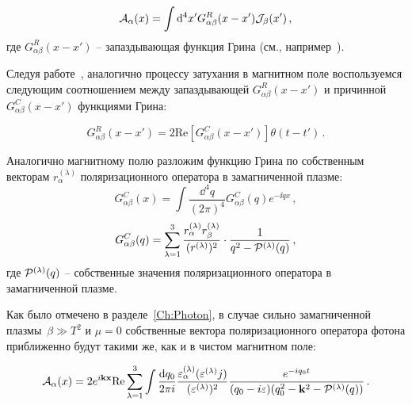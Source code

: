 \begin{equation}\label{eq:RetSol}
	{\cal A}_\alpha(x)=\int \mathrm{d}^4 x' G^R_{\alpha \beta}(x-x'){\cal J}_\beta(x')\, ,
\end{equation}
где $G^R_{\alpha \beta}(x-x')$ -- запаздывающая функция Грина (см., например~\cite{Landau:2001}).

Следуя работе~\cite{MikhChist:2001}, аналогично процессу затухания в магнитном поле воспользуемся следующим соотношением между запаздывающей $G^R_{\alpha\beta}(x-x')$ и причинной $G^C_{\alpha\beta}(x-x')$ функциями Грина:

\begin{equation}\label{eq:RetCasualGreen}
G^R_{\alpha\beta}(x-x')= 2 \mathrm{Re} \left[G^C_{\alpha\beta}(x-x')\right]\theta(t-t')\, .
\end{equation}

Аналогично магнитному полю разложим функцию Грина по собственным векторам $r_\alpha^{(\lambda)}$ поляризационного оператора в замагниченной плазме:
\begin{equation}\label{eq:InvGcFourier}
	G^C_{\alpha\beta}(x)=\int \frac{\dd^4q}{(2\pi)^4}G^C_{\alpha \beta}(q) e^{-\ii qx}\, ,
\end{equation}
\begin{equation}\label{eq:GcFourier}
	G^C_{\alpha\beta}(q)=\sum_{\lambda=1}^{3}\frac{r_\alpha^{(\lambda)}r^{(\lambda)}_\beta}{(r^{(\lambda)})^2}\cdot \frac{1}{q^2-{\cal P}^{(\lambda)}(q)}\, ,
\end{equation}
где ${\cal P}^{(\lambda)}(q)$ -- собственные значения поляризационного оператора в замагниченной плазме.


Как было отмечено в разделе~\ref{Ch:Photon}, в случае сильно замагниченной плазмы~$\beta\gg T^2$ и $\mu=0$ собственные вектора поляризационного оператора фотона приближенно будут такими же, как и в чистом магнитном поле:

\begin{equation}\label{eq:ASolve}
	{\cal A}_\alpha(x) = 2 e^{i \mathbf{kx}} \mathrm{Re} \sum_{\lambda=1}^3 \int\frac{\mathrm{d} q_0}{2\pi i}\frac{\varepsilon_\alpha^{(\lambda)}(\varepsilon^{(\lambda)} j)}{(\varepsilon^{(\lambda)})^2}\frac{e^{-i q_0 t}}{(q_0-i\varepsilon)(q_0^2-\mathbf{k}^2-{\cal P}^{(\lambda)}(q))}\, .
\end{equation}



